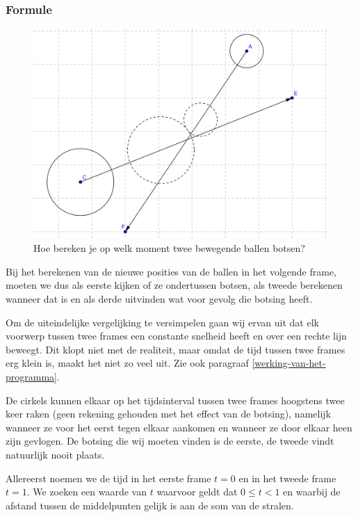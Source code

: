 \documentclass[12pt,a4paper]{article}
\begin{document}
	\subsubsection{Formule}
	\begin{figure}[h]
		\centerline{\includegraphics[width=\textwidth]{Plaatjes/Bal-Bal.png}}
		\caption{Hoe bereken je op welk moment twee bewegende ballen botsen?}
		\label{bal-bal}
	\end{figure}
	
	Bij het berekenen van de nieuwe posities van de ballen in het volgende frame, moeten we dus als eerste kijken of ze ondertussen botsen, als tweede berekenen wanneer dat is en als derde uitvinden wat voor gevolg die botsing heeft.
	
	Om de uiteindelijke vergelijking te versimpelen gaan wij ervan uit dat elk voorwerp tussen twee frames een constante snelheid heeft en over een rechte lijn beweegt. Dit klopt niet met de realiteit, maar omdat de tijd tussen twee frames erg klein is, maakt het niet zo veel uit. Zie ook paragraaf \ref{werking-van-het-programma}.
	
	De cirkels kunnen elkaar op het tijdsinterval tussen twee frames hoogstens twee keer raken (geen rekening gehouden met het effect van de botsing), namelijk wanneer ze voor het eerst tegen elkaar aankomen en wanneer ze door elkaar heen zijn gevlogen. De botsing die wij moeten vinden is de eerste, de tweede vindt natuurlijk nooit plaats.
	
	Allereerst noemen we de tijd in het eerste frame $t=0$ en in het tweede frame $t=1$. We zoeken een waarde van $t$ waarvoor geldt dat $0 \le t < 1$ en waarbij de afstand tussen de middelpunten gelijk is aan de som van de stralen.
	
\end{document}
